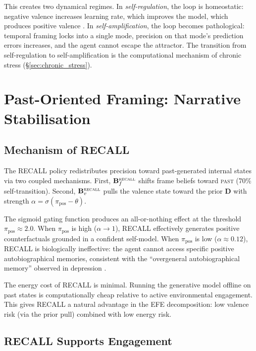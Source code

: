 \documentclass[11pt,a4paper]{article}
\begin{document}
This creates two dynamical regimes. In \emph{self-regulation}, the loop is homeostatic: negative valence increases learning rate, which improves the model, which produces positive valence \citep{joffily2013emotional}. In \emph{self-amplification}, the loop becomes pathological: temporal framing locks into a single mode, precision on that mode's prediction errors increases, and the agent cannot escape the attractor. The transition from self-regulation to self-amplification is the computational mechanism of chronic stress (\S\ref{sec:chronic_stress}).


\section{Past-Oriented Framing: Narrative Stabilisation}\label{sec:past}

\subsection{Mechanism of RECALL}\label{sec:recall_mechanism}

The RECALL policy redistributes precision toward past-generated internal states via two coupled mechanisms. First, $\mathbf{B}_f^{\textsc{recall}}$ shifts frame beliefs toward \textsc{past} (70\% self-transition). Second, $\mathbf{B}_v^{\textsc{recall}}$ pulls the valence state toward the prior $\mathbf{D}$ with strength $\alpha = \sigma(\pi_{\text{pos}} - \theta)$.

The sigmoid gating function produces an all-or-nothing effect at the threshold $\pi_{\text{pos}} \approx 2.0$. When $\pi_{\text{pos}}$ is high ($\alpha \to 1$), RECALL effectively generates positive counterfactuals grounded in a confident self-model. When $\pi_{\text{pos}}$ is low ($\alpha \approx 0.12$), RECALL is biologically ineffective: the agent cannot access specific positive autobiographical memories, consistent with the ``overgeneral autobiographical memory'' observed in depression \citep{williams2007autobiographical}.

The energy cost of RECALL is minimal. Running the generative model offline on past states is computationally cheap relative to active environmental engagement. This gives RECALL a natural advantage in the EFE decomposition: low valence risk (via the prior pull) combined with low energy risk.

\subsection{RECALL Supports Engagement}\label{sec:recall_engagement}
\end{document}
